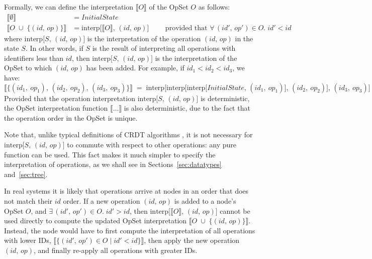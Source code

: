 Formally, we can define the interpretation $\llbracket O \rrbracket$ of the OpSet $O$ as follows:
\begin{align*}
    \big\llbracket \emptyset \big\rrbracket &= \mathit{InitialState} \\
    \big\llbracket O \;\cup\; \{(\mathit{id},\, \mathit{op})\} \big\rrbracket &=
    \mathrm{interp}\big[\llbracket O \rrbracket,\, (\mathit{id},\, \mathit{op})\big]
    \qquad\text{ provided that } \forall\,(\mathit{id}',\, \mathit{op}') \in O.\; \mathit{id}' < \mathit{id}
\end{align*}
where $\mathrm{interp}\big[S,\, (\mathit{id},\, \mathit{op})\big]$ is the interpretation of the operation $(\mathit{id},\, \mathit{op})$ in the state $S$.
In other words, if $S$ is the result of interpreting all operations with identifiers less than $\mathit{id}$, then
$\mathrm{interp}\big[S,\, (\mathit{id},\, \mathit{op})\big]$ is the interpretation of the OpSet to which $(\mathit{id},\, \mathit{op})$ has been added.
For example, if $\mathit{id}_1 < \mathit{id}_2 < \mathit{id}_3$, we have:
\[ \big\llbracket \{(\mathit{id}_1,\ \mathit{op}_1),\,
    (\mathit{id}_2,\ \mathit{op}_2),\,
    (\mathit{id}_3,\ \mathit{op}_3)\} \big\rrbracket \;=\;
    \mathrm{interp}\big[\mathrm{interp}\big[\mathrm{interp}\big[\mathit{InitialState},\,
    (\mathit{id}_1,\ \mathit{op}_1)\big],\,
    (\mathit{id}_2,\ \mathit{op}_2)\big],\,
    (\mathit{id}_3,\ \mathit{op}_3)\big] \]
Provided that the operation interpretation $\mathrm{interp}\big[S,\, (\mathit{id},\, \mathit{op})\big]$ is deterministic, the OpSet interpretation function $\llbracket\dots\rrbracket$ is also deterministic, due to the fact that the operation order in the OpSet is unique.

Note that, unlike typical definitions of CRDT algorithms \cite{Shapiro:2011wy,Shapiro:2011un}, it is not necessary for $\mathrm{interp}\big[S,\, (\mathit{id},\, \mathit{op})\big]$ to commute with respect to other operations: any pure function can be used.
This fact makes it much simpler to specify the interpretation of operations, as we shall see in Sections~\ref{sec:datatypes} and~\ref{sec:tree}.

In real systems it is likely that operations arrive at nodes in an order that does not match their $\mathit{id}$ order.
If a new operation $(\mathit{id},\, \mathit{op})$ is added to a node's OpSet $O$, and $\exists\,(\mathit{id}',\, \mathit{op}') \in O.\; \mathit{id}' > \mathit{id}$,
then $\mathrm{interp}\big[\llbracket O \rrbracket,\, (\mathit{id},\, \mathit{op})\big]$ cannot be used directly to compute the updated OpSet interpretation
$\big\llbracket O \;\cup\; \{(\mathit{id},\, \mathit{op})\} \big\rrbracket$.
Instead, the node would have to first compute the interpretation of all operations with lower IDs,
$\big\llbracket \{(\mathit{id}',\, \mathit{op}') \in O \mid \mathit{id}' < \mathit{id}\} \big\rrbracket$,
then apply the new operation $(\mathit{id},\, \mathit{op})$, and finally re-apply all operations with greater IDs.

